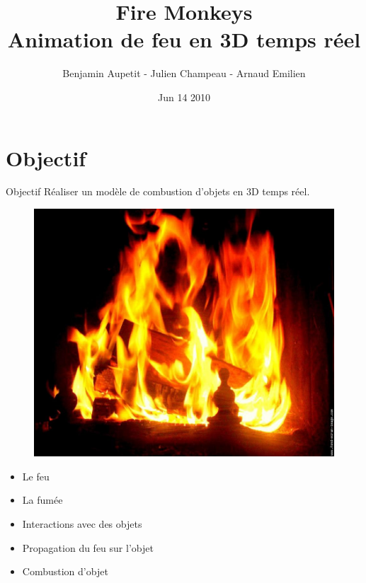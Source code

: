 \documentclass{beamer}
\title{Fire Monkeys\\ Animation de feu en 3D temps réel}
\author{Benjamin Aupetit - Julien Champeau - Arnaud Emilien}
\date{Jun 14 2010}
\begin{document}
\begin{frame}
   \titlepage
  
\end{frame}

\begin{frame}
  \tableofcontents
\end{frame}

\section{Objectif}
\begin{frame}{Objectif}
  Réaliser un modèle de combustion d'objets en 3D temps réel.\\
  
  \begin{minipage}{0.48\linewidth}
  \begin{figure}[h]
    \centering\includegraphics[scale=0.1]{feu.jpg}
  \end{figure}    
  \end{minipage}
  \begin{minipage}{0.48\linewidth}

  \begin{itemize}
    \item{Le feu}%
    \item{La fumée}%
    \item{Interactions avec des objets}%
    \item{Propagation du feu sur l'objet}%
    \item{Combustion d'objet}%
  \end{itemize}
  \end{minipage}
  
\end{frame}
\end{document}
